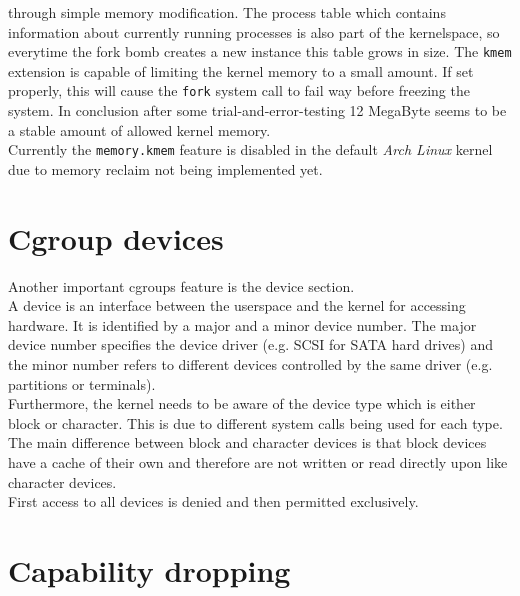 through simple memory modification. The process table which contains information about currently running processes is also part of the kernelspace,
so everytime the fork bomb creates a new instance this table grows in size.
The \texttt{kmem} extension is capable of limiting the kernel memory to a small amount. If set properly, this will cause the \texttt{fork}
system call to fail way before freezing the system. In conclusion after some trial-and-error-testing 12 MegaByte seems to be a
stable amount of allowed kernel memory.\\
Currently the \texttt{memory.kmem} feature is disabled in the default \textit{Arch Linux} kernel due to memory reclaim not being implemented yet\cite{kmembug}.\\

\section{Cgroup devices}

Another important cgroups feature is the device section.\\
A device is an interface between the userspace and the kernel for accessing hardware. It is identified by a major and a minor
device number.
The major device number specifies the device driver (e.g. SCSI for SATA hard drives) and the minor number refers to different
devices controlled by the same driver (e.g. partitions or terminals)\cite{devicenumbers}.\\
Furthermore, the kernel needs to be aware of the device type which is either block or character. This is due to different system
calls being used for each type.
The main difference between block and character devices is that block devices have a cache of their own and therefore are not
written or read directly upon like character devices.\\
First access to all devices is denied and then permitted exclusively.



\section{Capability dropping}\label{caps}

